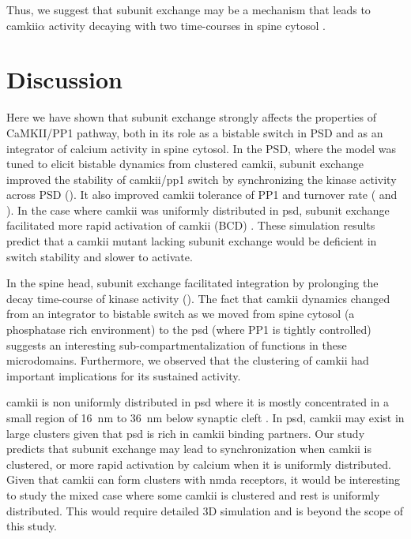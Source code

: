 \documentclass[9pt,lineno,doublespacing]{elife}
\begin{document}
Thus, we suggest that subunit exchange may be a mechanism that leads to
\gls{camkii}$\alpha$ activity decaying with two time-courses in spine 
cytosol \citep{chang_camkii_2017}.


\section{Discussion}\label{discussion}

Here we have shown that subunit exchange strongly affects the properties of
CaMKII/PP1 pathway, both in its role as a bistable switch in PSD and as an
integrator of calcium activity in spine cytosol. In the PSD, where the model was
tuned to elicit bistable dynamics from clustered \gls{camkii}, subunit exchange
improved the stability of \gls{camkii}/\gls{pp1} switch by synchronizing the
kinase activity across PSD (). It also improved
\gls{camkii} tolerance of PP1 and turnover rate (
and ). In the case where \gls{camkii} was uniformly
distributed in \gls{psd}, subunit exchange facilitated more rapid activation of
\gls{camkii} (BCD) 
\citep{stratton_activation-triggered_2014}.  These simulation results predict
that a \gls{camkii} mutant lacking subunit exchange would be deficient in 
switch stability and slower to activate.

In the spine head, subunit exchange facilitated integration by prolonging the
decay time-course of kinase activity ().  The
fact that \gls{camkii} dynamics changed from an integrator to bistable switch as
we moved from spine cytosol (a phosphatase rich environment) to the \gls{psd}
(where PP1 is tightly controlled) suggests an interesting
sub-compartmentalization of functions in these microdomains. Furthermore, we
observed that the clustering of \gls{camkii} had important implications for its
sustained activity.

\Gls{camkii} is non uniformly distributed in \gls{psd} where it is mostly
concentrated in a small region of \SI{16}{\nano \meter} to \SI{36}{\nano \meter}
below synaptic cleft \citep{petersen_distribution_2003}. In \gls{psd}, \gls{camkii} may exist in
large clusters given that \gls{psd} is rich in \gls{camkii} binding partners.
Our study predicts that subunit exchange may lead to synchronization when
\gls{camkii} is clustered, or more rapid activation by calcium when it is uniformly
distributed. Given that \gls{camkii} can form clusters with \gls{nmda}
receptors, it would be interesting to study the mixed case where some
\gls{camkii} is clustered and rest is uniformly distributed. This would require
detailed 3D simulation and is beyond the scope of this study.
\end{document}
